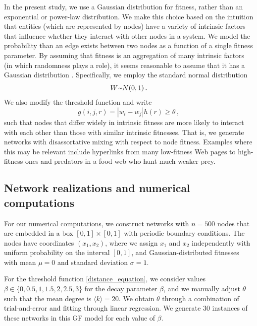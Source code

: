\documentclass[%
 reprint,
 amsmath,amssymb,
 aps,
]{revtex4-1}
\begin{document}
In the present study, we use a Gaussian distribution for fitness, rather than an exponential or power-law distribution. We make this choice based on the intuition that entities (which are represented by nodes) have a variety of intrinsic factors that influence whether they interact with other nodes in a system. We model the probability than an edge exists between two nodes as a function of a single fitness parameter. By assuming that fitness is an aggregation of many 
intrinsic factors (in which randomness plays a role), it seems reasonable to assume that it has a Gaussian distribution \cite{frank}. Specifically, we employ the standard normal distribution
\begin{equation}
        W {\raise.17ex\hbox{$\scriptstyle\mathtt{\sim}$}} N(0, 1)\,.
\end{equation}
We also modify the threshold function and write
\begin{equation}
    g(i, j, r) = |w_i - w_j| h(r) \geq \theta\,,
\end{equation}
such that nodes that differ widely in intrinsic fitness are more likely to interact with each other than those with similar intrinsic fitnesses. That is, we generate networks with disassortative mixing with respect to node fitness. Examples where this may be relevant include hyperlinks from many low-fitness Web pages to high-fitness ones and predators in a food web who hunt much weaker prey.


\subsection{Network realizations and numerical computations}\label{sec:fitness_numerics}

For our numerical computations, we construct networks with $n = 500$ nodes that are embedded 
in a box $[0, 1] \times [0, 1]$ with periodic boundary conditions. The nodes have coordinates $(x_1, x_2)$, where we assign $x_1$ and $x_2$ independently with uniform probability on the interval $[0,1]$, and Gaussian-distributed fitnesses with mean $\mu = 0$ and standard deviation $\sigma = 1$. 

For the threshold function \eqref{distance_equation}, we consider values $\beta \in \{ 0, 0.5, 1, 1.5, 2, 2.5, 3 \}$ for the decay parameter $\beta$, and we manually adjust $\theta$ such that the mean degree is $\langle k \rangle = 20$. We obtain $\theta$ through a combination of trial-and-error and fitting through linear regression. We generate $30$ instances of these networks in this GF model for each value of $\beta$.
\end{document}
